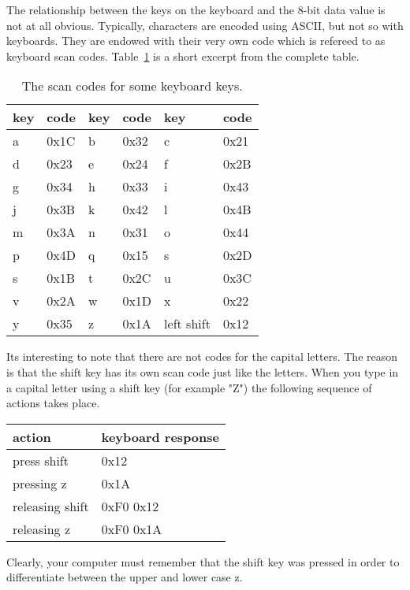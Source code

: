 The relationship between the keys on the keyboard and the 8-bit data
value is not at all obvious.  Typically, characters are encoded using
ASCII, but not so with keyboards.  They are endowed with their very
own code which is refereed to as keyboard scan codes.  
Table~\ref{table:keyboard} is a short excerpt from the complete table.


\begin{table}
\begin{tabular}{l|l|l|l|l|l}
key & code	& key & code	& key & code \\ \hline \hline
a   & 0x1C	& b   & 0x32	& c   & 0x21	\\ \hline
d   & 0x23	& e   & 0x24	& f   & 0x2B	\\ \hline
g   & 0x34	& h   & 0x33	& i   & 0x43	\\ \hline
j   & 0x3B	& k   & 0x42	& l   & 0x4B	\\ \hline
m   & 0x3A	& n   & 0x31	& o   & 0x44	\\ \hline
p   & 0x4D	& q   & 0x15	& s   & 0x2D	\\ \hline
s   & 0x1B	& t   & 0x2C	& u   & 0x3C	\\ \hline
v   & 0x2A	& w   & 0x1D	& x   & 0x22	\\ \hline
y   & 0x35	& z   & 0x1A	& left shift & 0x12	\\ 
\end{tabular}
\caption{The scan codes for some keyboard keys.}
\label{table:keyboard}
\end{table}

Its interesting to note that there are not codes for the capital
letters.  The reason is that the shift key has its own scan
code just like the letters.  When you type in a capital letter
using a shift key (for example "Z") the following sequence of 
actions takes place.

\begin{tabular} {l|l}
action		&	keyboard response	\\ \hline \hline
press shift	&	0x12			\\ \hline
pressing z	&	0x1A			\\ \hline
releasing shift	&	0xF0 0x12		\\ \hline
releasing z	&	0xF0 0x1A		\\ 
\end{tabular}

Clearly, your computer must remember that the shift key was pressed 
in order to differentiate between the upper and lower case z.

